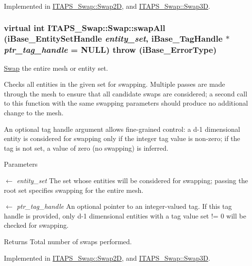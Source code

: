 Implemented in \hyperlink{class_i_t_a_p_s___swap_1_1_swap2_d_a84a78678e5e830d16c725a93f3b5038f}{ITAPS\_\-Swap::Swap2D}, and \hyperlink{class_i_t_a_p_s___swap_1_1_swap3_d_a82a135da16b4ef6e5ff36f8293cc450c}{ITAPS\_\-Swap::Swap3D}.

\hypertarget{class_i_t_a_p_s___swap_1_1_swap_a8a1fdc1a12fb71dfe28881b10277eafc}{
\subsubsection[{swapAll}]{\setlength{\rightskip}{0pt plus 5cm}virtual int ITAPS\_\-Swap::Swap::swapAll (iBase\_\-EntitySetHandle {\em entity\_\-set}, \/  iBase\_\-TagHandle $\ast$ {\em ptr\_\-tag\_\-handle} = {\ttfamily NULL})  throw (iBase\_\-ErrorType)}}
\label{class_i_t_a_p_s___swap_1_1_swap_a8a1fdc1a12fb71dfe28881b10277eafc}


\hyperlink{class_i_t_a_p_s___swap_1_1_swap}{Swap} the entire mesh or entity set. 

Checks all entities in the given set for swapping. Multiple passes are made through the mesh to ensure that all candidate swaps are considered; a second call to this function with the same swapping parameters should produce no additional change to the mesh.

An optional tag handle argument allows fine-\/grained control: a d-\/1 dimensional entity is considered for swapping only if the integer tag value is non-\/zero; if the tag is not set, a value of zero (no swapping) is inferred.


\begin{DoxyParams}{Parameters}
\item[\mbox{$\leftarrow$} {\em entity\_\-set}]The set whose entities will be considered for swapping; passing the root set specifies swapping for the entire mesh.\item[\mbox{$\leftarrow$} {\em ptr\_\-tag\_\-handle}]An optional pointer to an integer-\/valued tag. If this tag handle is provided, only d-\/1 dimensional entities with a tag value set != 0 will be checked for swapping.\end{DoxyParams}
\begin{DoxyReturn}{Returns}
Total number of swaps performed. 
\end{DoxyReturn}


Implemented in \hyperlink{class_i_t_a_p_s___swap_1_1_swap2_d_a4bee7d3a08e3ff6ac85a81ec321479ef}{ITAPS\_\-Swap::Swap2D}, and \hyperlink{class_i_t_a_p_s___swap_1_1_swap3_d_a139a400102ad7039fcc74d92d72dea27}{ITAPS\_\-Swap::Swap3D}.



